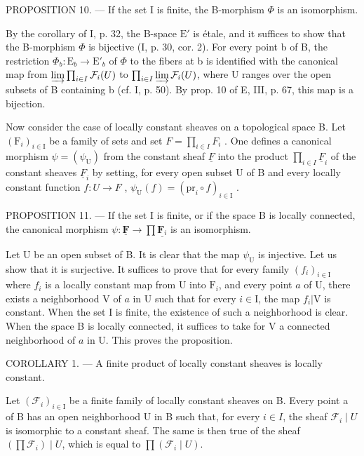 PROPOSITION 10. --- If the set I is finite, the B-morphism \(\Phi\) is an isomorphism.

By the corollary of I, p. 32, the B-space \(\mathrm{E}'\) is étale, and it suffices to show that the B-morphism \(\Phi\) is bijective (I, p. 30, cor. 2). For every point b of B, the restriction \(\Phi_b\colon \mathrm{E}_b\to \mathrm{E}'_b\) of \(\Phi\) to the fibers at b is identified with the canonical map from \(\varinjlim\prod_{i\in I}\mathcal{F}_{i}(U)\) to \(\prod_{i\in I}\varinjlim\mathcal{F}_{i}(U)\), where U ranges over the open subsets of B containing b (cf. I, p. 50). By prop. 10 of E, III, p. 67, this map is a bijection.

Now consider the case of locally constant sheaves on a topological space B. Let \((\mathrm{F}_{i})_{i\in\mathrm{I}}\) be a family of sets and set \(F=\prod_{i\in I}F_{i}\) . One defines a canonical morphism \(\psi=(\psi_{\mathrm{U}})\) from the constant sheaf \(\underline{F}\) into the product \(\prod_{i\in I}\underline{F}_{i}\) of the constant sheaves \(\underline{F}_{i}\) by setting, for every open subset U of B and every locally constant function \(f\colon U\to F\) , \(\psi_{\mathrm{U}}(f)=(\mathrm{pr}_{i}\circ f)_{i\in\mathrm{I}}\) .

PROPOSITION 11. --- If the set I is finite, or if the space B is locally connected, the canonical morphism \(\psi\colon\underline{\mathbf{F}}\to\prod\underline{\mathbf{F}_{i}}\) is an isomorphism.

Let U be an open subset of B. It is clear that the map \(\psi_{\mathrm{U}}\) is injective. Let us show that it is surjective. It suffices to prove that for every family \((f_i)_{i\in \mathrm{I}}\) where \(f_{i}\) is a locally constant map from U into \(\mathrm{F}_i\), and every point \(a\) of U, there exists a neighborhood V of \(a\) in U such that for every \(i\in \mathrm{I}\), the map \(f_{i}|\mathrm{V}\) is constant. When the set I is finite, the existence of such a neighborhood is clear. When the space B is locally connected, it suffices to take for V a connected neighborhood of \(a\) in U. This proves the proposition.

COROLLARY 1. --- A finite product of locally constant sheaves is locally constant.

Let \((\mathcal{F}_{i})_{i\in\mathrm{I}}\) be a finite family of locally constant sheaves on B. Every point a of B has an open neighborhood U in B such that, for every \(i\in I\), the sheaf \(\mathcal{F}_{i}\mid U\) is isomorphic to a constant sheaf. The same is then true of the sheaf \((\prod\mathcal{F}_{i})\mid U\), which is equal to \(\prod(\mathcal{F}_{i}\mid U)\).


